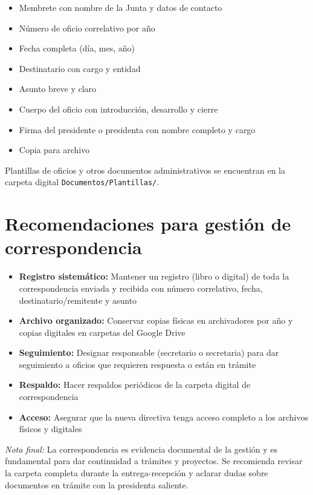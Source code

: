 \begin{itemize}
  \item Membrete con nombre de la Junta y datos de contacto
  \item Número de oficio correlativo por año
  \item Fecha completa (día, mes, año)
  \item Destinatario con cargo y entidad
  \item Asunto breve y claro
  \item Cuerpo del oficio con introducción, desarrollo y cierre
  \item Firma del presidente o presidenta con nombre completo y cargo
  \item Copia para archivo
\end{itemize}

Plantillas de oficios y otros documentos administrativos se encuentran en la carpeta digital \texttt{Documentos/Plantillas/}.

\section*{Recomendaciones para gestión de correspondencia}

\begin{itemize}
  \item \textbf{Registro sistemático:} Mantener un registro (libro o digital) de toda la correspondencia enviada y recibida con número correlativo, fecha, destinatario/remitente y asunto
  \item \textbf{Archivo organizado:} Conservar copias físicas en archivadores por año y copias digitales en carpetas del Google Drive
  \item \textbf{Seguimiento:} Designar responsable (secretario o secretaria) para dar seguimiento a oficios que requieren respuesta o están en trámite
  \item \textbf{Respaldo:} Hacer respaldos periódicos de la carpeta digital de correspondencia
  \item \textbf{Acceso:} Asegurar que la nueva directiva tenga acceso completo a los archivos físicos y digitales
\end{itemize}

\textit{Nota final:} La correspondencia es evidencia documental de la gestión y es fundamental para dar continuidad a trámites y proyectos. Se recomienda revisar la carpeta completa durante la entrega-recepción y aclarar dudas sobre documentos en trámite con la presidenta saliente.
